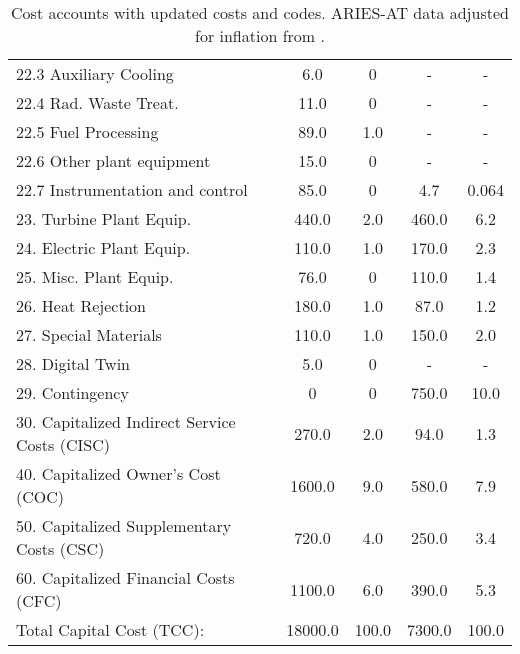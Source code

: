 \begin{table}[h!]
{\begin{tabular}{lcccc}
\hspace{10mm}22.3 Auxiliary Cooling & 6.0 & 0 & - & - \\
\hspace{10mm}22.4 Rad. Waste Treat. & 11.0 & 0 & - & - \\
\hspace{10mm}22.5 Fuel Processing & 89.0 & 1.0 & - & - \\
\hspace{10mm}22.6 Other plant equipment & 15.0 & 0 & - & - \\
\hspace{10mm}22.7 Instrumentation and control & 85.0 & 0 & 4.7 & 0.064 \\
\hspace{5mm}23. Turbine Plant Equip. & 440.0 & 2.0 & 460.0 & 6.2 \\
\hspace{5mm}24. Electric Plant Equip. & 110.0 & 1.0 & 170.0 & 2.3 \\
\hspace{5mm}25. Misc. Plant Equip. & 76.0 & 0 & 110.0 & 1.4 \\
\hspace{5mm}26. Heat Rejection & 180.0 & 1.0 & 87.0 & 1.2 \\
\hspace{5mm}27. Special Materials & 110.0 & 1.0 & 150.0 & 2.0 \\
\hspace{5mm}28. Digital Twin & 5.0 & 0 & - & - \\
\hspace{5mm}29. Contingency & 0 & 0 & 750.0 & 10.0 \\
30. Capitalized Indirect Service Costs (CISC) & 270.0 & 2.0 & 94.0 & 1.3 \\
40. Capitalized Owner’s Cost (COC) & 1600.0 & 9.0 & 580.0 & 7.9 \\
50. Capitalized Supplementary Costs (CSC) & 720.0 & 4.0 & 250.0 & 3.4 \\
60. Capitalized Financial Costs (CFC) & 1100.0 & 6.0 & 390.0 & 5.3 \\
\hline
Total Capital Cost (TCC): & 18000.0 & 100.0 & 7300.0 & 100.0 \\
\hline
\end{tabular}
}
\caption{Cost accounts with updated costs and codes. ARIES-AT data adjusted for inflation from \cite{gordon1986mirror}.}
\label{tab:costs_updated_codes}
\end{table}


